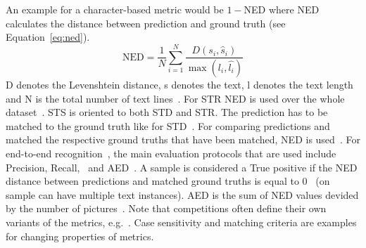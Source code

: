 An example for a character-based metric would be $1 - $NED where \ac{NED}
calculates the distance between prediction and ground truth (see Equation~\ref{eq:ned}).
\begin{equation}\label{eq:ned}
    \text{NED} = \frac{1}{N}\sum_{i=1}^N \frac{D(s_i,\hat{s}_i)}{\max(l_i,\hat{l_i})}
\end{equation}
D denotes the Levenshtein distance, s denotes the text, l denotes the text length and N is the total
number of text lines~\citep{shi_icdar2017_2017}.
For \ac{STR} \ac{NED} is used over the whole dataset~\citep{karatzas_icdar_2013}.
\ac{STS} is oriented to both \ac{STD} and \ac{STR}.
The prediction has to be matched to the ground truth like for \ac{STD}~\citep{long_scene_2021}.
For comparing predictions and matched the respective ground truths that have been matched, \ac{NED}
is used~\citep{chen_text_2021}.
For end-to-end recognition~\citep{karatzas_icdar_2013,karatzas_icdar_2015}, the main evaluation
protocols that are used include Precision, Recall, \fone\ and \ac{AED}~\citep{chen_text_2021}.
A sample is considered a True positive if the \ac{NED} distance between predictions and
matched ground truths is equal to 0~\citep{sun_icdar_2019} (on sample can have multiple text
instances).
\ac{AED} is the sum of \ac{NED} values devided by the number of pictures~\citep{chen_text_2021}.
Note that competitions often define their own variants of the metrics,
e.g.~\cite{he_icpr2018_2018,shi_icdar2017_2017}.
Case sensitivity and matching criteria are examples for changing properties of metrics.

